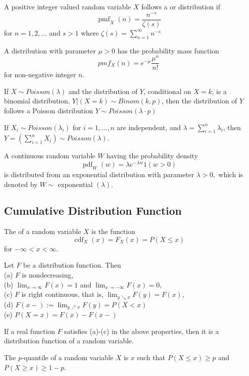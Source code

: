 \documentclass[11pt]{article}
\begin{document}
A positive integer valued random variable \(X\) follows a  or  distribution if
$$
\operatorname{pmf}_{X}(n)=\frac{n^{-s}}{\zeta(s)}
$$
for \(n=1,2, \ldots\) and \(s>1\) where \(\zeta(s)=\sum_{n=1}^{\infty} n^{-s}\)

A  distribution with parameter $\mu > 0$ has the probability mass function
$$ pmf_X(n) = e^{-\mu}\frac{\mu^n}{n!}$$
for non-negative integer $n$.

\theorem
If $X \sim Poisson(\lambda)$ and the distribution of $Y$, conditional on $X = k$, is a binomial distribution, $Y | (X=k) \sim Binom(k,p)$, then the distribution of $Y$ follows a Poisson distribution $Y \sim Poisson(\lambda \cdot p)$

If $X_i \sim Poisson(\lambda_i)$ for $i = 1,\hdots,n$ are independent, and $\lambda = \sum_{i=1}^n \lambda_i$, then $Y = \left( \sum_{i=1}^n X_i\right) \sim Poisson(\lambda)$.


A continuous random variable \(W\) having the probability density
$$
\operatorname{pdf}_{W}(w)=\lambda e^{-\lambda w} 1(w>0)
$$
is distributed from an exponential distribution with parameter \(\lambda>0,\) which is denoted by
\(W \sim\) exponential \((\lambda)\).

\subsection{Cumulative Distribution Function}
The  of a random variable \(X\) is the function
$$
\operatorname{cdf}_{X}(x)=F_{X}(x)=P(X \leq x)
$$
for \(-\infty<x<\infty\).

Let \(F\) be a distribution function. Then\\
(a) \(F\) is nondecreasing,\\
(b) \(\lim _{x \rightarrow \infty} F(x)=1\) and \(\lim _{x \rightarrow-\infty} F(x)=0\),\\
(c) \(F\) is right continuous, that is, \(\lim _{y \searrow x}F(y)=F(x),\)\\
(d) \(F(x-):=\lim_{y \nearrow x} F(y) =P(X<x)\)\\
(e) \(P(X=x)=F(x)-F(x-)\)

\theorem
If a real function $F$ satisfies (a)-(c) in the above properties, then it is a distribution function of a random variable.

The $p$-quantile of a random variable $X$ is $x$ such that $P(X \leq x) \geq p$ and $P(X \geq x) \geq 1-p$.
\end{document}

